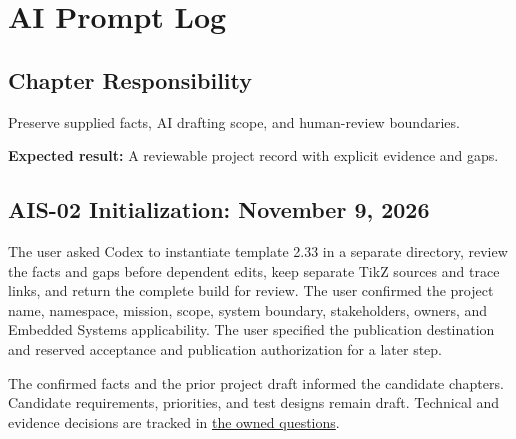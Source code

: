 \chapter{AI Prompt Log}
\section{Chapter Responsibility}
\label{Section:AIPromptLogResponsibility}
Preserve supplied facts, AI drafting scope, and human-review boundaries.

\noindent\textbf{Expected result:} A reviewable project record with explicit evidence and gaps.


\section{AIS-02 Initialization: November 9, 2026}
The user asked Codex to instantiate template 2.33 in a separate directory,
review the facts and gaps before dependent edits, keep separate TikZ sources
and trace links, and return the complete build for review. The user confirmed
the project name, namespace, mission, scope, system boundary, stakeholders,
owners, and Embedded Systems applicability. The user specified the
publication destination and reserved acceptance and publication authorization
for a later step.

The confirmed facts and the prior project draft informed the candidate
chapters. Candidate requirements, priorities, and test designs remain draft.
Technical and evidence decisions are tracked in
\hyperref[Table:OwnedQuestions]{the owned questions}.
